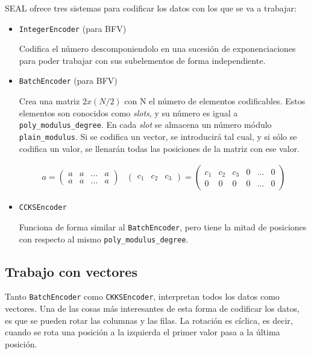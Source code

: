 SEAL ofrece tres sistemas para codificar los datos con los que se va a trabajar:
\begin{itemize}
    \item \verb|IntegerEncoder| (para BFV)

    Codifica el número descomponiendolo en una sucesión de exponenciaciones para poder trabajar con sus subelementos de forma independiente.

    \item \verb|BatchEncoder| (para BFV)

    Crea una matriz $2x(N/2)$ con N el número de elementos codificables. Estos elementos son conocidos como \textit{slots}, y su número es igual a \verb|poly_modulus_degree|. En cada \textit{slot} se almacena un número módulo \verb|plain_modulus|. Si se codifica un vector, se introducirá tal cual, y si sólo se codifica un valor, se llenarán todas las posiciones de la matriz con ese valor.

    \begin{gather}
      a =
      \begin{pmatrix}
        a & a & \hdots & a \\
        a & a & \hdots & a
      \end{pmatrix} &
      \begin{pmatrix}
        c_1 & c_2 & c_3
      \end{pmatrix}
      =
      \begin{pmatrix}
        c_1 & c_2   & c_3   & 0     & \hdots & 0 \\
        0   & 0     & 0     & 0     & \hdots & 0
      \end{pmatrix}
    \end{gather}

    \item \verb|CCKSEncoder|

    Funciona de forma similar al \verb|BatchEncoder|, pero tiene la mitad de posiciones con respecto al mismo \verb|poly_modulus_degree|.
\end{itemize}{}

\subsection{Trabajo con vectores}

Tanto \verb|BatchEncoder| como \verb|CKKSEncoder|, interpretan todos los datos como vectores. Una de las cosas más interesantes de esta forma de codificar los datos, es que se pueden rotar las columnas y las filas. La rotación es cíclica, es decir, cuando se rota una posición a la izquierda el primer valor pasa a la última posición.

